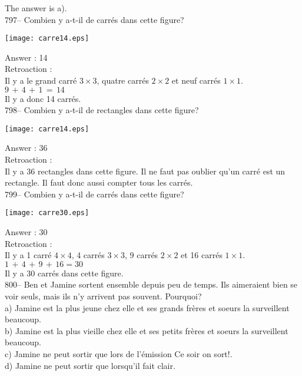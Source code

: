﻿\documentclass[letterpaper, 12pt]{article}
\begin{document}
The answer is a).\\

797-- Combien y a-t-il de carr\'es dans cette figure?\\
    \begin{center}
    \texttt{[image: carre14.eps]}
    \end{center}


Answer : 14\\

Retroaction : \\
Il y a le grand carr\'e $3\times3$, quatre carr\'es $2\times2$ et neuf
carr\'es $1\times1$.\\
$9\,+\,4\,+\,1\,=\,14$\\
Il y a donc 14 carr\'es.\\

798-- Combien y a-t-il de rectangles dans cette figure?\\
    \begin{center}
    \texttt{[image: carre14.eps]}
    \end{center}

Answer : 36\\

Retroaction : \\
Il y a 36 rectangles dans cette figure.  Il ne faut pas oublier qu'un
carr\'e est un rectangle.  Il faut donc aussi compter tous les carr\'es.  \\

799-- Combien y a-t-il de carr\'es dans cette figure?\\
    \begin{center}
    \texttt{[image: carre30.eps]}
    \end{center}

Answer : 30\\

Retroaction : \\
Il y a 1 carr\'e $4\times4$, 4 carr\'es $3\times3$, 9 carr\'es
$2\times2$ et 16 carr\'es $1\times1$.\\
$1\,+\,4\,+\,9\,+\,16=30$\\
Il y a 30 carr\'es dans cette figure.\\

800-- Ben et Jamine sortent ensemble depuis peu de temps.  Ils aimeraient
bien se voir seuls, mais ils n'y arrivent pas souvent.  Pourquoi?\\
a) Jamine est la plus jeune chez elle et ses grands fr\`eres et soeurs la
surveillent beaucoup.\\
b) Jamine est la plus vieille chez elle et ses petits fr\`eres et soeurs la
surveillent beaucoup.\\
c) Jamine ne peut sortir que lors de l'\'emission \og Ce soir on sort!\fg .\\
d) Jamine ne peut sortir que lorsqu'il fait clair.\\
\end{document}
